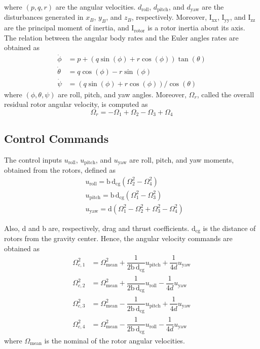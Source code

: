 \documentclass[3p,times]{elsarticle}
\begin{document}
\noindent where $(p, q, r)$ are the angular velocities. $d_{\text{roll}}$, $d_{\text{pitch}}$, and $d_{\text{yaw}}$ are the disturbances generated in $x_B$, $y_B$, and $z_B$, respectively. Moreover, $\mathrm{I}_{\text{xx}}$, $\mathrm{I}_{\text{yy}}$, and $\mathrm{I}_{\text{zz}}$ are the principal moment of inertia, and $\mathrm{I}_{\text{rotor}}$ is a rotor  inertia  about its axis.
The relation between the angular body rates and the Euler angles rates are obtained as
\begin{align}
    \dot\phi &= p + (q\sin(\phi) + r\cos(\phi))\tan(\theta)\\
\dot \theta &= q\cos(\phi) - r\sin(\phi)\\
\dot\psi &= (q\sin(\phi) + r\cos(\phi))/{\cos(\theta)}
\end{align}
where $(\phi, \theta, \psi)$ are roll, pitch, and yaw angles.
Moreover, $\Omega_r$, called the overall residual rotor angular velocity, is computed as
\begin{equation}
	\Omega_r = -\Omega_1 + \Omega_2 - \Omega_3 + \Omega_4
\end{equation}
\subsection{Control Commands}
\noindent The control inputs $u_{\text{roll}}$, $u_{\text{pitch}}$, and $u_{\text{yaw}}$ are roll, pitch, and yaw moments, obtained from the rotors, defined as
\begin{align}
		&u_{\text{roll}} = \mathrm{b\,d}_{\text{cg}} (\Omega_2^2 - \Omega_4^2)\\
	&u_{\text{pitch}} = \mathrm{b\,d}_{\text{cg}} (\Omega_1^2 - \Omega_3^2) \\
	&u_{\text{yaw}} = \mathrm{d} (\Omega_1^2 - \Omega_2^2 + \Omega_3^2 - \Omega_4^2)
\end{align}

Also, d and b are, respectively, drag and thrust coefficients. $\mathrm{d}_{\text{cg}}$ is the distance of rotors from the gravity center. Hence, the angular velocity commands are obtained as
\begin{align}
		\Omega_{c, 1}^2 &= \Omega_{\text{mean}}^2 + \dfrac{1}{2\mathrm{b\,d}_{\text{cg}}}u_{\text{pitch}} + \dfrac{1}{4d}u_{\text{yaw}} \\
	\Omega_{c, 2}^2 &= \Omega_{\text{mean}}^2 + \dfrac{1}{2\mathrm{b\,d}_{\text{cg}}}u_{\text{roll}} - \dfrac{1}{4d}u_{\text{yaw}}\\
	\Omega_{c, 3}^2 &= \Omega_{\text{mean}}^2 - \dfrac{1}{2\mathrm{b\,d}_{\text{cg}}}u_{\text{pitch}} + \dfrac{1}{4d}u_{\text{yaw}} \\
\Omega_{c, 4}^2 &= \Omega_{\text{mean}}^2 - \dfrac{1}{2\mathrm{b\,d}_{\text{cg}}}u_{\text{roll}} - \dfrac{1}{4d}u_{\text{yaw}}
\end{align}
where $\Omega_{\text{mean}}$ is the nominal of the rotor angular velocities.
\end{document}
